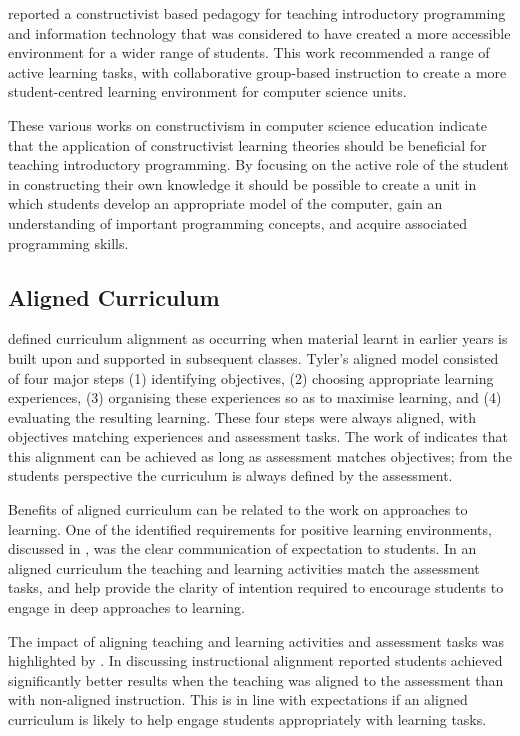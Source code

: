 \citet{Wulf:2005} reported a constructivist based pedagogy for teaching introductory programming and information technology that was considered to have created a more accessible environment for a wider range of students. This work recommended a range of active learning tasks, with collaborative group-based instruction to create a more student-centred learning environment for computer science units.

These various works on constructivism in computer science education indicate that the application of constructivist learning theories should be beneficial for teaching introductory programming. By focusing on the active role of the student in constructing their own knowledge it should be possible to create a unit in which students develop an appropriate model of the computer, gain an understanding of important programming concepts, and acquire associated programming skills.


\subsection{Aligned Curriculum} %
\label{sub:aligned_curriculum}

\citet{Tyler:1969} defined curriculum alignment as occurring when material learnt in earlier years is built upon and supported in subsequent classes. Tyler's aligned model consisted of four major steps (1) identifying objectives, (2) choosing appropriate learning experiences, (3) organising these experiences so as to maximise learning, and (4) evaluating the resulting learning. These four steps were always aligned, with objectives matching experiences and assessment tasks. The work of \cite{Ramsden:1992} indicates that this alignment can be achieved as long as assessment matches objectives; from the students perspective the curriculum is always defined by the assessment.

Benefits of aligned curriculum can be related to the work on approaches to learning. One of the identified requirements for positive learning environments, discussed in , was the clear communication of expectation to students. In an aligned curriculum the teaching and learning activities match the assessment tasks, and help provide the clarity of intention required to encourage students to engage in deep approaches to learning.

The impact of aligning teaching and learning activities and assessment tasks was highlighted by \citet{Cohen:1987}. In discussing instructional alignment \citet{Cohen:1987} reported students achieved significantly better results when the teaching was aligned to the assessment than with non-aligned instruction. This is in line with expectations if an aligned curriculum is likely to help engage students appropriately with learning tasks.

